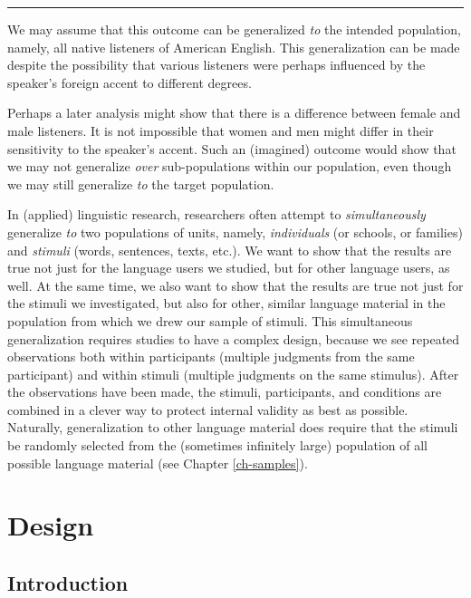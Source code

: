 \documentclass[
]{book}
\begin{document}
\begin{center}\rule{0.5\linewidth}{0.5pt}\end{center}

We may assume that this outcome can be generalized \emph{to} the intended population, namely, all native listeners of American English. This generalization can be made despite the possibility that various listeners were perhaps influenced by the speaker's foreign accent to different degrees.

Perhaps a later analysis might show that there is a difference between female and male listeners. It is not impossible that women and men might differ in their sensitivity to the speaker's accent. Such an (imagined) outcome would show that we may not generalize \emph{over} sub-populations within our population, even though we may still generalize \emph{to} the target population.

In (applied) linguistic research, researchers often attempt to \emph{simultaneously} generalize \emph{to} two populations of units, namely, \emph{individuals} (or schools, or families) and \emph{stimuli} (words, sentences, texts, etc.). We want to show that the results are true not just for the language users we studied, but for other language users, as well. At the same time, we also want to show that the results are true not just for the stimuli we investigated, but also for other, similar language material in the population from which we drew our sample of stimuli. This simultaneous generalization requires studies to have a complex design, because we see repeated observations both within participants (multiple judgments from the same participant) and within stimuli (multiple judgments on the same stimulus). After the observations have been made, the stimuli, participants, and conditions are combined in a clever way to protect internal validity as best as possible. Naturally, generalization to other language material does require that the stimuli be randomly selected from the (sometimes infinitely large) population of all possible language material (see Chapter \ref{ch-samples}).

\hypertarget{ch-design}{%
\chapter{Design}\label{ch-design}}

\hypertarget{sec:design-introduction}{%
\section{Introduction}\label{sec:design-introduction}}
\end{document}

